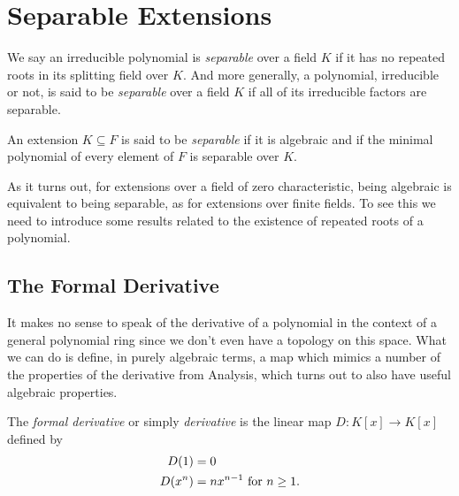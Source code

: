\documentclass[12pt,oneside]{book}
\begin{document}
\section{Separable Extensions}
\begin{definition}
	We say an irreducible polynomial is \emph{separable} over a field \( K \) if it has no
	repeated roots in its splitting field over \( K \). And more generally, a polynomial,
	irreducible or not, is said to be \emph{separable} over a field \( K \) if all of its
	irreducible factors are separable.
\end{definition}
\begin{definition}
	An extension \( K \subseteq F \) is said to be \emph{separable} if it is algebraic and
	if the minimal polynomial of every element of \( F \) is separable over \( K \).
\end{definition}
As it turns out, for extensions over a field of zero characteristic, being algebraic is
equivalent to being separable, as for extensions over finite fields. To see this we need
to introduce some results related to the existence of repeated roots of a polynomial.

\subsection{The Formal Derivative}
It makes no sense to speak of the derivative of a polynomial in the context of a general
polynomial ring since we don't even have a topology on this space. What we can do is
define, in purely algebraic terms, a map which mimics a number of the properties of the
derivative from Analysis, which turns out to also have useful algebraic properties. 
\begin{definition}
	The \emph{formal derivative} or simply \emph{derivative} is the linear map \( D \colon
	K[x] \to K[x] \) defined by
	\begin{align*}
		D(1) & = 0\\
		D(x^n) & = nx^{n-1} \text{ for \( n \geq 1 \)}.
	\end{align*}
\end{definition}
\end{document}
